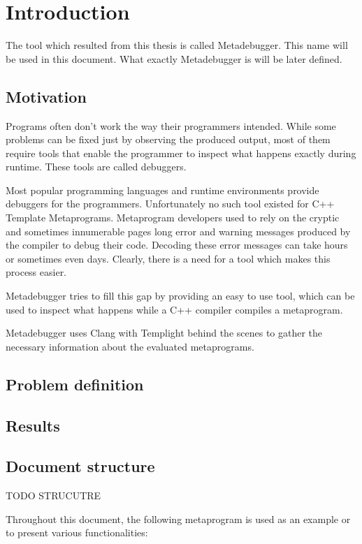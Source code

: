 
\chapter{Introduction}

The tool which resulted from this thesis is called Metadebugger. This name will
be used in this document. What exactly Metadebugger is will be later defined.

\section{Motivation}

Programs often don't work the way their programmers intended. While some
problems can be fixed just by observing the produced output, most of them
require tools that enable the programmer to inspect what happens exactly
during runtime. These tools are called debuggers.

Most popular programming languages and runtime environments provide debuggers
for the programmers. Unfortunately no such tool existed for C++ Template
Metaprograms. Metaprogram developers used to rely on the cryptic and sometimes
innumerable pages long error and warning messages produced by the compiler to
debug their code. Decoding these error messages can take hours or sometimes
even days. Clearly, there is a need for a tool which makes this process easier.

Metadebugger tries to fill this gap by providing an easy to use tool, which can
be used to inspect what happens while a C++ compiler compiles a metaprogram.

Metadebugger uses Clang with Templight behind the scenes to gather the
necessary information about the evaluated metaprograms.

\section{Problem definition}

\section{Results} %

\section{Document structure} %

TODO STRUCUTRE

Throughout this document, the following metaprogram is used as an example or to
present various functionalities:

